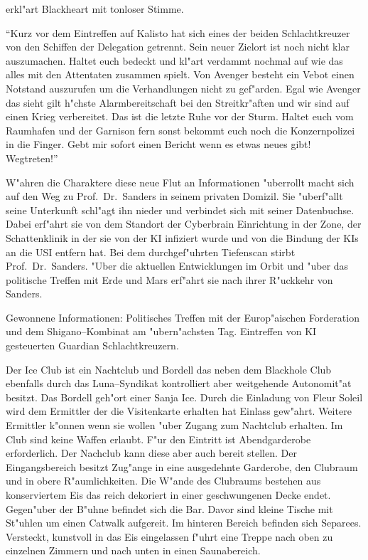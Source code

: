 erkl"art Blackheart mit tonloser Stimme. 

"`Kurz vor dem Eintreffen auf Kalisto hat sich eines der beiden Schlachtkreuzer von den Schiffen der Delegation getrennt. Sein neuer Zielort ist noch nicht klar auszumachen. Haltet euch bedeckt und kl"art verdammt nochmal auf wie das alles mit den Attentaten zusammen spielt. Von Avenger besteht ein Vebot einen Notstand auszurufen um die Verhandlungen nicht zu gef"arden. Egal wie Avenger das sieht gilt h"chste Alarmbereitschaft bei den Streitkr"aften und wir sind auf einen Krieg verbereitet. Das ist die letzte Ruhe vor der Sturm. Haltet euch vom Raumhafen und der Garnison fern sonst bekommt euch noch die Konzernpolizei in die Finger. Gebt mir sofort einen Bericht wenn es etwas neues gibt! Wegtreten!"'

W"ahren die Charaktere diese neue Flut an Informationen "uberrollt macht sich \xl{} auf den Weg zu Prof.~Dr.~Sanders in seinem privaten Domizil. Sie "uberf"allt seine Unterkunft schl"agt ihn nieder und verbindet sich mit seiner Datenbuchse. Dabei erf"ahrt sie von dem Standort der Cyberbrain Einrichtung in der Zone, der Schattenklinik in der sie von der KI infiziert wurde und von \emph{} die Bindung der KIs an die USI entfern hat. Bei dem durchgef"uhrten Tiefenscan stirbt Prof.~Dr.~Sanders. "Uber die aktuellen Entwicklungen im Orbit und "uber das politische Treffen mit Erde und Mars erf"ahrt sie nach ihrer R"uckkehr von Sanders.

\begin{remarks}
	Gewonnene Informationen: Politisches Treffen mit der Europ"aischen Forderation und dem Shigano--Kombinat am "ubern"achsten Tag. Eintreffen von KI gesteuerten Guardian Schlachtkreuzern.
\end{remarks}


Der Ice Club ist ein Nachtclub und Bordell das neben dem Blackhole Club ebenfalls durch das Luna--Syndikat kontrolliert aber weitgehende Autonomit"at besitzt. Das Bordell geh"ort einer Sanja Ice. Durch die Einladung von Fleur Soleil wird dem Ermittler der die Visitenkarte erhalten hat Einlass gew"ahrt. Weitere Ermittler k"onnen wenn sie wollen "uber \xl{} Zugang zum Nachtclub erhalten. Im Club sind keine Waffen erlaubt. F"ur den Eintritt ist Abendgarderobe erforderlich. Der Nachclub kann diese aber auch bereit stellen. Der Eingangsbereich besitzt Zug"ange in eine ausgedehnte Garderobe, den Clubraum und in obere R"aumlichkeiten. Die W"ande des Clubraums bestehen aus konserviertem Eis das reich dekoriert in einer geschwungenen Decke endet. Gegen"uber der B"uhne befindet sich die Bar. Davor sind kleine Tische mit St"uhlen um einen Catwalk aufgereit. Im hinteren Bereich befinden sich Separees. Versteckt, kunstvoll in das Eis eingelassen f"uhrt eine Treppe nach oben zu einzelnen Zimmern und nach unten in einen Saunabereich.

